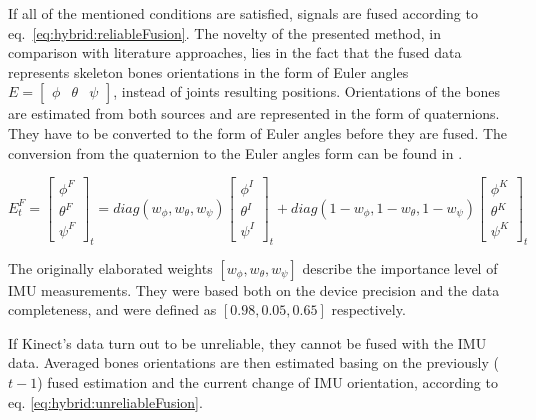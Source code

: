 \documentclass[sensors,article,submit,moreauthors,pdftex,10pt,a4paper]{mdpi}
\begin{document}
	If all of the mentioned conditions are satisfied, signals are fused according to eq.~\ref{eq:hybrid:reliableFusion}. The novelty of the presented method, in comparison with literature approaches, lies in the fact that the fused data represents skeleton bones orientations in the form of Euler angles $E = \begin{bmatrix} \phi &  \theta & \psi \end{bmatrix}$, instead of joints resulting positions. Orientations of the bones are estimated from both sources and are represented in the form of quaternions. They have to be converted to the form of Euler angles before they are fused. The conversion from the quaternion to the Euler angles form can be found in \cite{Dunn2011}.
		
	\begin{equation} E^F_t = 
		\begin{bmatrix}  \phi^F \\  \theta^F \\  \psi^F \end{bmatrix}_t = 
		diag(w_\phi,w_\theta,w_\psi)
		\begin{bmatrix}  \phi^I \\  \theta^I \\  \psi^I \end{bmatrix}_t + 
		diag(1-w_\phi,1-w_\theta,1-w_\psi)
		\begin{bmatrix}  \phi^K \\  \theta^K \\  \psi^K \end{bmatrix}_t
		\label{eq:hybrid:reliableFusion}
	\end{equation}
		
	The originally elaborated weights $[w_\phi , w_\theta , w_\psi]$ describe the importance level of IMU measurements. They were based both on the device precision and the data completeness, and were defined as $[0.98, 0.05, 0.65]$ respectively. 
		
	If Kinect’s data turn out to be unreliable, they cannot be fused with the IMU data. Averaged bones orientations are then estimated basing on the previously ($t-1$) fused estimation and the current change of IMU orientation, according to eq. \ref{eq:hybrid:unreliableFusion}.
		
\end{document}
